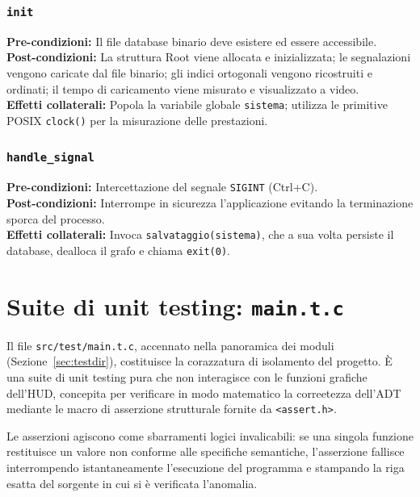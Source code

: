 \documentclass[12pt, a4paper]{article}
\begin{document}
\subsubsection{\texttt{init}}
\vspace{3mm}
\begin{specbox}
\textbf{Pre-condizioni:} Il file database binario deve esistere ed essere accessibile. \\
\textbf{Post-condizioni:} La struttura Root viene allocata e inizializzata; le segnalazioni vengono caricate dal file binario; gli indici ortogonali vengono ricostruiti e ordinati; il tempo di caricamento viene misurato e visualizzato a video. \\
\textbf{Effetti collaterali:} Popola la variabile globale \texttt{sistema}; utilizza le primitive POSIX \texttt{clock()} per la misurazione delle prestazioni.
\end{specbox}

\subsubsection{\texttt{handle\_signal}}
\vspace{3mm}
\begin{specbox}
\textbf{Pre-condizioni:} Intercettazione del segnale \texttt{SIGINT} (Ctrl+C). \\
\textbf{Post-condizioni:} Interrompe in sicurezza l'applicazione evitando la terminazione sporca del processo. \\
\textbf{Effetti collaterali:} Invoca \texttt{salvataggio(sistema)}, che a sua volta persiste il database, dealloca il grafo e chiama \texttt{exit(0)}.
\end{specbox}

\section{Suite di unit testing: \texttt{main.t.c}}
Il file \texttt{src/test/main.t.c}, accennato nella panoramica dei moduli (Sezione~\ref{sec:testdir}), costituisce la corazzatura di isolamento del progetto. È una suite di unit testing pura che non interagisce con le funzioni grafiche dell'HUD, concepita per verificare in modo matematico la correetezza dell'ADT mediante le macro di asserzione strutturale fornite da \texttt{<assert.h>}.

Le asserzioni agiscono come sbarramenti logici invalicabili: se una singola funzione restituisce un valore non conforme alle specifiche semantiche, l'asserzione fallisce interrompendo istantaneamente l'esecuzione del programma e stampando la riga esatta del sorgente in cui si è verificata l'anomalia.
\end{document}
